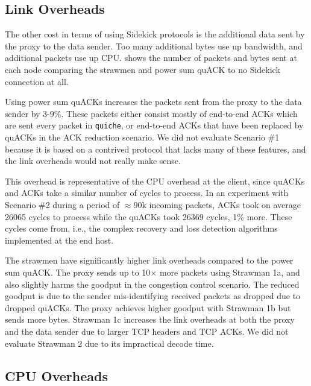 \subsection{Link Overheads}
\label{sec:sidekick:evaluation:link-overheads}



The other cost in terms of using Sidekick protocols is the additional data
sent by the proxy to the data sender.
Too many additional bytes use up bandwidth, and additional packets use
up CPU\@.
 shows the number of packets and bytes sent at each
node comparing the strawmen and power sum quACK to no Sidekick connection at all.

Using power sum quACKs increases the packets sent from the proxy to the data
sender
by 3-9\%. These packets either consist mostly
of end-to-end ACKs which are sent every packet in \texttt{quiche}, or end-to-end
ACKs that have been replaced by quACKs in the ACK reduction scenario.
We did not evaluate Scenario \#1 because it is based
on a contrived protocol that lacks many of these features, and the link
overheads would not really make sense.

This overhead is representative of the CPU overhead at the client, since
quACKs and ACKs take a similar number of cycles to process. In an experiment
with Scenario \#2 during a period of $\approx90$k incoming packets, ACKs took on
average 26065 cycles to process while the quACKs took 26369 cycles, 1\% more.
These cycles come from, i.e., the complex recovery and loss detection algorithms
implemented at the end host.

The strawmen have significantly higher link overheads compared to the power sum
quACK\@. The proxy sends up to 10$\times$ more packets using Strawman 1a, and
also slightly harms the goodput in the congestion control scenario.
The reduced goodput is due to the sender mis-identifying received packets as
dropped due to dropped quACKs.
The proxy achieves higher goodput with Strawman 1b but sends
more bytes. Strawman 1c increases the link overheads at both the proxy and the
data sender due to larger TCP headers and TCP ACKs.
We did not evaluate Strawman 2 due to its impractical decode time.

\subsection{CPU Overheads}
\label{sec:sidekick:evaluation:cpu-overheads}

